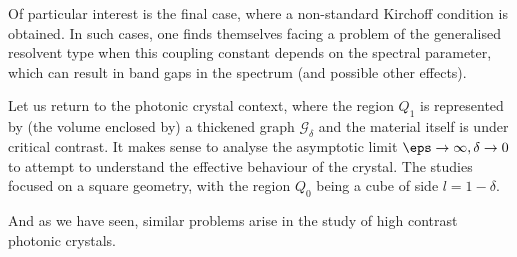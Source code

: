 Of particular interest is the final case, where a non-standard Kirchoff condition is obtained.
In such cases, one finds themselves facing a problem of the generalised resolvent type when this coupling constant depends on the spectral parameter, which  can result in band gaps in the spectrum (and possible other effects).

Let us return to the photonic crystal context, where the region $Q_1$ is represented by (the volume enclosed by) a thickened graph $\mathcal{G}_\delta$ and the material itself is under critical contrast.
It makes sense to analyse the asymptotic limit $\eps\rightarrow\infty, \delta\rightarrow0$ to attempt to understand the effective behaviour of the crystal.
The studies  focused on a square geometry, with the region $Q_0$ being a cube of side $l=1-\delta$.

And as we have seen,   similar problems arise in the study of high contrast photonic crystals.
